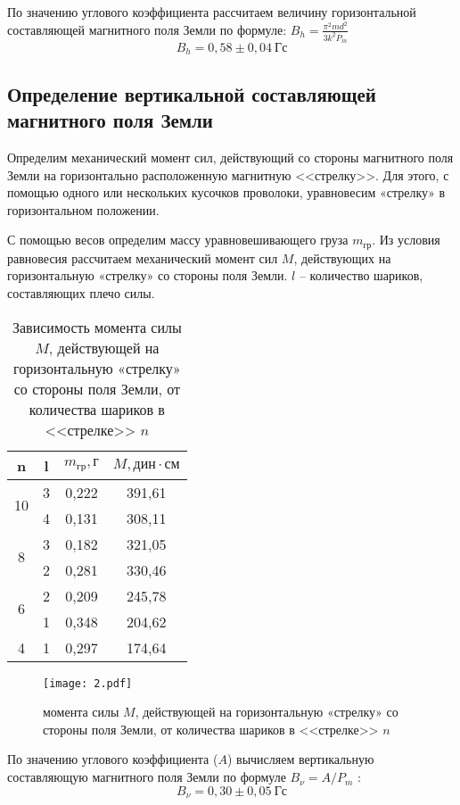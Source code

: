 По значению углового коэффициента рассчитаем величину горизонтальной составляющей магнитного поля
Земли по формуле: $B_h = \frac{\pi^2 m d^2}{3 k^2 P_m}$ 
\[B_h = 0,58 \pm 0,04\ \text{Гс}\]

\subsection*{Определение вертикальной составляющей магнитного поля Земли}
Определим механический момент сил, действующий со стороны магнитного поля Земли на горизонтально
расположенную магнитную <<стрелку>>. Для этого, с помощью одного или нескольких кусочков проволоки,
уравновесим «стрелку» в горизонтальном положении.

С помощью весов определим массу
уравновешивающего груза $m_{\text{гр}}$. Из условия равновесия рассчитаем механический момент сил
$M$, действующих на горизонтальную «стрелку» со стороны поля Земли. $l$ -- количество шариков,
составляющих плечо силы.
\begin{table}[H]
\centering
\begin{tabular}{|c|c|c|c|}
\hline
n  & l & $m_\text{гр}, \text{г}$     & $M, \text{дин} \cdot \text{см}$   \\ \hline
\multirow{2}{*}{10} & 3 & 0,222 & 391,61 \\ \cline{2-4} 
                    & 4 & 0,131 & 308,11 \\ \hline
\multirow{2}{*}{8}  & 3 & 0,182 & 321,05 \\ \cline{2-4} 
                    & 2 & 0,281 & 330,46 \\ \hline
\multirow{2}{*}{6}  & 2 & 0,209 & 245,78 \\ \cline{2-4} 
                    & 1 & 0,348 & 204,62 \\ \hline
4                   & 1 & 0,297 & 174,64 \\ \hline
\end{tabular}
\captionsetup{justification=centering}
\caption{Зависимость момента силы $M$, действующей на горизонтальную «стрелку» со стороны поля
Земли, от количества шариков в <<стрелке>> $n$}
\end{table}
\begin{figure}[H]
    \centering
    \texttt{[image: 2.pdf]}
    \captionsetup{justification=centering}
    \caption{момента силы $M$, действующей на горизонтальную «стрелку» со стороны поля
Земли, от количества шариков в <<стрелке>> $n$}
\end{figure}
По значению углового коэффициента ($A$) вычисляем вертикальную составляющую магнитного поля Земли
по формуле $B_\nu = A/P_m$ :
\[ B_\nu  = 0,30 \pm 0,05\ \text{Гс}\]

